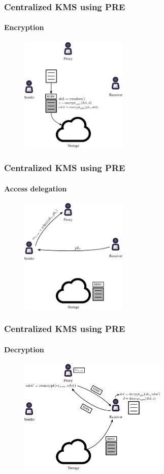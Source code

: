 \documentclass[xetex,mathsans,sans]{beamer}
\begin{document}
    \begin{frame}
        \frametitle{Centralized KMS using PRE}
        \framesubtitle{Encryption}
        \begin{figure}
            \centering
            \includegraphics[height=5.5cm]{pdf/encrypt.pdf}
        \end{figure}
    \end{frame}

    \begin{frame}
        \frametitle{Centralized KMS using PRE}
        \framesubtitle{Access delegation}
        \begin{figure}
            \centering
            \includegraphics[height=5.5cm]{pdf/delegate.pdf}
        \end{figure}
    \end{frame}

    \begin{frame}
        \frametitle{Centralized KMS using PRE}
        \framesubtitle{Decryption}
        \begin{figure}
            \centering
            \includegraphics[height=5.5cm]{pdf/decrypt.pdf}
        \end{figure}
    \end{frame}
\end{document}
